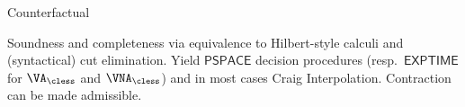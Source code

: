\begin{entry}{Counterfactual}
\begin{technicalities}
  Soundness and completeness via equivalence to Hilbert-style calculi
  and (syntactical) cut elimination. Yield $\mathsf{PSPACE}$ decision
  procedures (resp.\ $\mathsf{EXPTIME}$ for $\VA_\cless$ and
  $\VNA_\cless$) and in most cases Craig Interpolation. Contraction
  can be made admissible. \cite{Lellmann:2012fk,Lellmann:2013}
\end{technicalities}
%

\clearpage

\end{entry}

